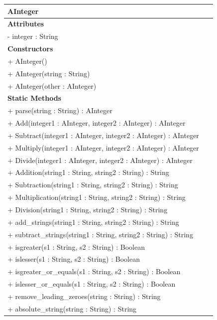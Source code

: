 \documentclass{article}
\begin{document}
\begin{center}
\begin{tabular}{|>{\raggedright\arraybackslash}p{0.95\linewidth}|}
\hline
\textbf{\large AInteger} \\
\hline
\textbf{Attributes} \\
\hline
- integer : String \\
\hline
\textbf{Constructors} \\
\hline
+ AInteger() \\
+ AInteger(string : String) \\
+ AInteger(other : AInteger) \\
\hline
\textbf{Static Methods} \\
\hline
+ parse(string : String) : AInteger \\
+ Add(integer1 : AInteger, integer2 : AInteger) : AInteger \\
+ Subtract(integer1 : AInteger, integer2 : AInteger) : AInteger \\
+ Multiply(integer1 : AInteger, integer2 : AInteger) : AInteger \\
+ Divide(integer1 : AInteger, integer2 : AInteger) : AInteger \\
+ Addition(string1 : String, string2 : String) : String \\
+ Subtraction(string1 : String, string2 : String) : String \\
+ Multiplication(string1 : String, string2 : String) : String \\
+ Division(string1 : String, string2 : String) : String \\
+ add\_strings(string1 : String, string2 : String) : String \\
+ subtract\_strings(string1 : String, string2 : String) : String \\
+ isgreater(s1 : String, s2 : String) : Boolean \\
+ islesser(s1 : String, s2 : String) : Boolean \\
+ isgreater\_or\_equals(s1 : String, s2 : String) : Boolean \\
+ islesser\_or\_equals(s1 : String, s2 : String) : Boolean \\
+ remove\_leading\_zeroes(string : String) : String \\
+ absolute\_string(string : String) : String \\
\hline
\end{tabular}
\end{center}
\end{document}
